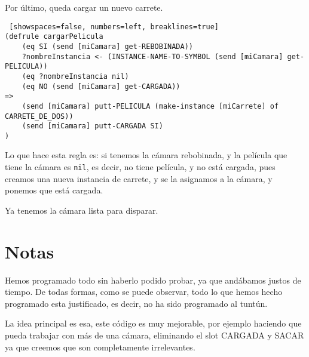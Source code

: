 \documentclass[hidelinks]{scrreprt}
\begin{document}
Por \'{u}ltimo, queda cargar un nuevo carrete.

\begin{lstlisting} [showspaces=false, numbers=left, breaklines=true]
(defrule cargarPelicula
    (eq SI (send [miCamara] get-REBOBINADA))
    ?nombreInstancia <- (INSTANCE-NAME-TO-SYMBOL (send [miCamara] get-PELICULA))
    (eq ?nombreInstancia nil)
    (eq NO (send [miCamara] get-CARGADA))
=>
    (send [miCamara] putt-PELICULA (make-instance [miCarrete] of CARRETE_DE_DOS))
    (send [miCamara] putt-CARGADA SI)
)
\end{lstlisting}

Lo que hace esta regla es: si tenemos la c\'{a}mara rebobinada, y la pel\'{i}cula que tiene
la c\'{a}mara es \texttt{nil}, es decir, no tiene pel\'{i}cula, y no est\'{a} cargada, pues creamos
una nueva instancia de carrete, y se la asignamos a la c\'{a}mara, y ponemos que est\'{a} cargada.

Ya tenemos la c\'{a}mara lista para disparar.

\appendix
\chapter{Notas}
Hemos programado todo sin haberlo podido probar, ya que and\'{a}bamos justos de tiempo. De todas formas, como
se puede observar, todo lo que hemos hecho programado esta justificado, es decir, no ha sido programado al tunt\'{u}n.

La idea principal es esa, este c\'{o}digo es muy mejorable, por ejemplo haciendo que pueda trabajar con m\'{a}s de una 
c\'{a}mara, eliminando el slot CARGADA y SACAR ya que creemos que son completamente irrelevantes.
\end{document}
